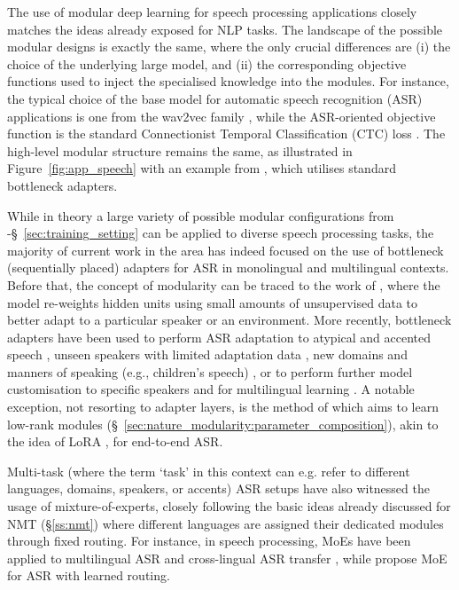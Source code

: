 \documentclass[10pt]{article} %
\begin{document}
The use of modular deep learning for speech processing applications closely matches the ideas already exposed for NLP tasks. The landscape of the possible modular designs is exactly the same, where the only crucial differences are (i) the choice of the underlying large model, and (ii) the corresponding objective functions used to inject the specialised knowledge into the modules. For instance, the typical choice of the base model for automatic speech recognition (ASR) applications is one from the wav2vec family \citep{Baevski:2020wav2vec,Babu:2022xlsr}, while the ASR-oriented objective function is the standard Connectionist Temporal Classification (CTC) loss \citep{Graves:2006ctc}. The high-level modular structure remains the same, as illustrated in Figure~\ref{fig:app_speech} with an example from \citet{Thomas:2022speech}, which utilises standard bottleneck adapters.

 



While in theory a large variety of possible modular configurations from -\S~\ref{sec:training_setting} can be applied to diverse speech processing tasks, the majority of current work in the area has indeed focused on the use of bottleneck (sequentially placed) adapters for ASR in monolingual and multilingual contexts. Before that, the concept of modularity can be traced to the work of \citet{Swietojanski:2016taslp}, where the model re-weights hidden units using small amounts of unsupervised data to better adapt to a particular speaker or an environment. More recently, bottleneck adapters have been used to perform ASR adaptation to atypical and accented speech \citep{tomanek-etal-2021-residual}, unseen speakers with limited adaptation data \citep{Wang:2022speech,Eeckt:2022speech,Chen:2022speech}, new domains and manners of speaking (e.g., children's speech) \citep{Fan:2022speech,Zhu:2022speech}, or to perform further model customisation to specific speakers \citep{Biadsy:2022speech,Sathyendra:2022speech} and for multilingual learning \citep{Kannan:2019interspeech,Hou:2022speech}. A notable exception, not resorting to adapter layers, is the method of \citep{Winata:2020speech} which aims to learn low-rank modules (\S~\ref{sec:nature_modularity:parameter_composition}), akin to the idea of LoRA \citep{hu2021lora}, for end-to-end ASR.




Multi-task (where the term `task' in this context can e.g. refer to different languages, domains, speakers, or accents) ASR setups have also witnessed the usage of mixture-of-experts, closely following the basic ideas already discussed for NMT (\S\ref{ss:nmt}) where different languages are assigned their dedicated modules through fixed routing. For instance, in speech processing, MoEs have been applied to multilingual ASR and cross-lingual ASR transfer \citep{Bai:2022speech,Gaur:2021speechmoe,Kumatani:2021arxiv}, while \cite{you2022speechmoe2} propose MoE for ASR with learned routing.
\end{document}
